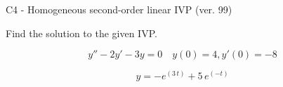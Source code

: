 \begin{exercise}
  \begin{exerciseTitle}C4 - Homogeneous second-order linear IVP (ver. 99)\end{exerciseTitle}
  \begin{exerciseStatement}
    
Find the solution to the given IVP.

    
\[y''-2y'-3y = 0 \hspace{1em} y(0) = 4 , y'(0) = -8\]

  \end{exerciseStatement}
  \begin{exerciseAnswer}
    
\[y= -e^{\left(3 \, t\right)} + 5 \, e^{\left(-t\right)}\]

  \end{exerciseAnswer}
\end{exercise}